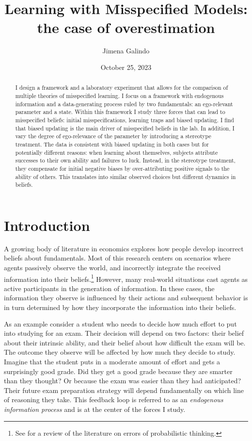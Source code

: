 \documentclass[
  12pt,
]{article}
\title{Learning with Misspecified Models: the case of overestimation}
\author{Jimena Galindo}
\date{October 25, 2023}
\begin{document}
\maketitle
\begin{abstract}
I design a framework and a laboratory experiment that allows for the
comparison of multiple theories of misspecified learning. I focus on a
framework with endogenous information and a data-generating process
ruled by two fundamentals: an ego-relevant parameter and a state. Within
this framework I study three forces that can lead to misspecified
beliefs: initial misspecifications, learning traps and biased updating.
I find that biased updating is the main driver of misspecified beliefs
in the lab. In addition, I vary the degree of ego-relevance of the
parameter by introducing a stereotype treatment. The data is consistent
with biased updating in both cases but for potentially different
reasons: when learning about themselves, subjects attribute successes to
their own ability and failures to luck. Instead, in the stereotype
treatment, they compensate for initial negative biases by
over-attributing positive signals to the ability of others. This
translates into similar observed choices but different dynamics in
beliefs.
\end{abstract}

\newpage

\hypertarget{introduction}{%
\section{Introduction}\label{introduction}}

A growing body of literature in economics explores how people develop
incorrect beliefs about fundamentals. Most of this research centers on
scenarios where agents passively observe the world, and incorrectly
integrate the received information into their
beliefs.\footnote{See \citet{benjamin2019} for a review of the literature on errors of 
probabilistic thinking.} However, many real-world situations cast agents
as active participants in the generation of information. In these cases,
the information they observe is influenced by their actions and
subsequent behavior is in turn determined by how they incorporate the
information into their beliefs.

As an example consider a student who needs to decide how much effort to
put into studying for an exam. Their decision will depend on two
factors: their belief about their intrinsic ability, and their belief
about how difficult the exam will be. The outcome they observe will be
affected by how much they decide to study. Imagine that the student puts
in a moderate amount of effort and gets a surprisingly good grade. Did
they get a good grade because they are smarter than they thought? Or
because the exam was easier than they had anticipated? Their future exam
preparation strategy will depend fundamentally on which line of
reasoning they take. This feedback loop is referred to as an
\emph{endogenous information 
process} and is at the center of the forces I study.
\end{document}
